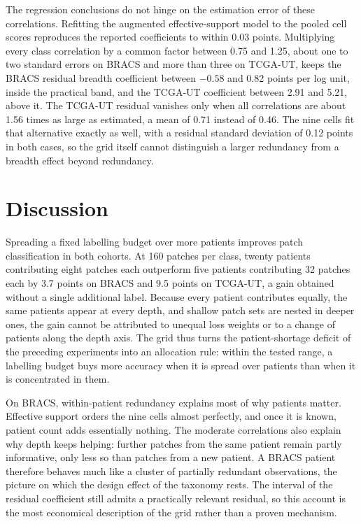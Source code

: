 The regression conclusions do not hinge on the estimation error of these correlations. Refitting the augmented effective-support model to the pooled cell scores reproduces the reported coefficients to within 0.03 points. Multiplying every class correlation by a common factor between 0.75 and 1.25, about one to two standard errors on BRACS and more than three on TCGA-UT, keeps the BRACS residual breadth coefficient between $-0.58$ and 0.82 points per log unit, inside the practical band, and the TCGA-UT coefficient between 2.91 and 5.21, above it. The TCGA-UT residual vanishes only when all correlations are about 1.56 times as large as estimated, a mean of 0.71 instead of 0.46. The nine cells fit that alternative exactly as well, with a residual standard deviation of 0.12 points in both cases, so the grid itself cannot distinguish a larger redundancy from a breadth effect beyond redundancy.

\section{Discussion}
\label{sec:discussion}
Spreading a fixed labelling budget over more patients improves patch classification in both cohorts. At 160 patches per class, twenty patients contributing eight patches each outperform five patients contributing 32 patches each by 3.7 points on BRACS and 9.5 points on TCGA-UT, a gain obtained without a single additional label. Because every patient contributes equally, the same patients appear at every depth, and shallow patch sets are nested in deeper ones, the gain cannot be attributed to unequal loss weights or to a change of patients along the depth axis. The grid thus turns the patient-shortage deficit of the preceding experiments into an allocation rule: within the tested range, a labelling budget buys more accuracy when it is spread over patients than when it is concentrated in them.

On BRACS, within-patient redundancy explains most of why patients matter. Effective support orders the nine cells almost perfectly, and once it is known, patient count adds essentially nothing. The moderate correlations also explain why depth keeps helping: further patches from the same patient remain partly informative, only less so than patches from a new patient. A BRACS patient therefore behaves much like a cluster of partially redundant observations, the picture on which the design effect of the taxonomy rests. The interval of the residual coefficient still admits a practically relevant residual, so this account is the most economical description of the grid rather than a proven mechanism.

